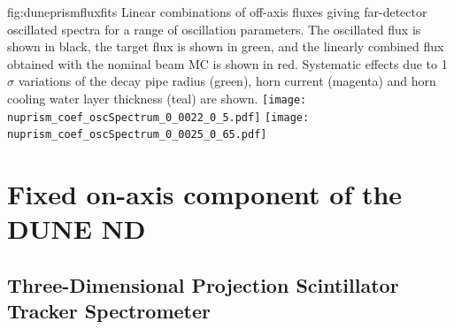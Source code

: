 \begin{dunefigure}{fig:duneprismfluxfits}
{Linear combinations of off-axis fluxes giving far-detector oscillated spectra for a range of oscillation parameters. The   oscillated flux is shown in black, the target flux is shown in green, and the linearly combined flux obtained with the nominal beam MC is shown in red. Systematic effects due to 1 $\sigma$ variations of the decay pipe radius (green), horn current (magenta) and horn cooling water layer thickness (teal) are shown.}
	\texttt{[image: nuprism\_coef\_oscSpectrum\_0\_0022\_0\_5.pdf]}
	\texttt{[image: nuprism\_coef\_oscSpectrum\_0\_0025\_0\_65.pdf]}
\end{dunefigure}




\section{Fixed on-axis component of the DUNE ND}

\subsection{Three-Dimensional Projection Scintillator Tracker Spectrometer}
\label{sec:exsum-nd-mpt-3dst}

